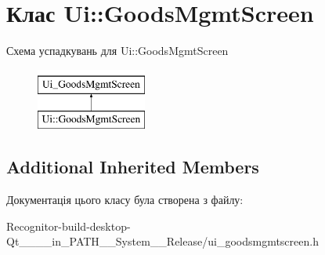 \hypertarget{classUi_1_1GoodsMgmtScreen}{\section{Клас Ui\-:\-:Goods\-Mgmt\-Screen}
\label{classUi_1_1GoodsMgmtScreen}
}
Схема успадкувань для Ui\-:\-:Goods\-Mgmt\-Screen\begin{figure}[H]
\begin{center}
\leavevmode
\includegraphics[height=2.000000cm]{classUi_1_1GoodsMgmtScreen}
\end{center}
\end{figure}
\subsection*{Additional Inherited Members}


Документація цього класу була створена з файлу\-:\begin{DoxyCompactItemize}
\item 
Recognitor-\/build-\/desktop-\/\-Qt\-\_\-\_\-\_\-\_\-in\-\_\-\-P\-A\-T\-H\-\_\-\-\_\-\-System\-\_\-\-\_\-\-Release/ui\-\_\-goodsmgmtscreen.\-h\end{DoxyCompactItemize}
